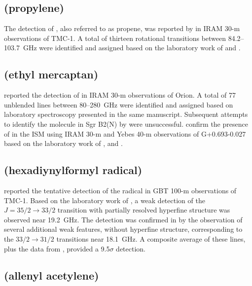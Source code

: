 \documentclass[twocolumn]{aastex631}
\newcommand{\update}[1]{{#1}}
\begin{document}
	\subsection{ (propylene)}
	\label{CH2CHCH3}
	
	The detection of , also referred to as propene, was reported by \citet{Marcelino:2007pu} in IRAM 30-m observations of TMC-1.  A total of thirteen rotational transitions between 84.2--103.7~GHz were identified and assigned based on the laboratory work of \citet{Wlodarczak:1994fb} and \citet{Pearson:1994kt}.
	
	\subsection{ (ethyl mercaptan)}
	\label{CH3CH2SH}
	
	\citet{Kolesnikova:2014fb} reported the detection of  in IRAM 30-m observations of Orion.  A total of 77 unblended lines between 80--280~GHz were identified and assigned based on laboratory spectroscopy presented in the same manuscript.  Subsequent attempts to identify the molecule in Sgr B2(N) by \citet{Muller:2016kd} were unsuccessful. \update{ \citet{RodriguezAlmeida:2021ht} confirm the presence of \ce{CH3CH2SH} in the ISM using IRAM 30-m and Yebes 40-m observations of G+0.693-0.027 based on the laboratory work of \citet{1975JChPh..62.3864S}, \citet{Kolesnikova:2014fb} and \citet{Muller:2016kd}.}
	
	\subsection{ (hexadiynylformyl radical)}
	\label{HC7O}
	
	\citet{McGuire:2017ud} reported the tentative detection of the  radical in GBT 100-m observations of TMC-1.  Based on the laboratory work of \citet{Mohamed:2005ku}, a weak detection of the $J = 35/2\rightarrow33/2$ transition with partially resolved hyperfine structure was observed near 19.2~GHz.  The detection was confirmed in \citet{Cordiner:2017dq} by the observation of several additional weak features, without hyperfine structure, corresponding to the $33/2\rightarrow31/2$ transitions near 18.1~GHz.  A composite average of these lines, plus the data from \citet{McGuire:2017ud}, provided a 9.5$\sigma$ detection.
	
	\subsection{\update{ (allenyl acetylene)}}
	\label{H2CCCHCCH}
	
\end{document}
